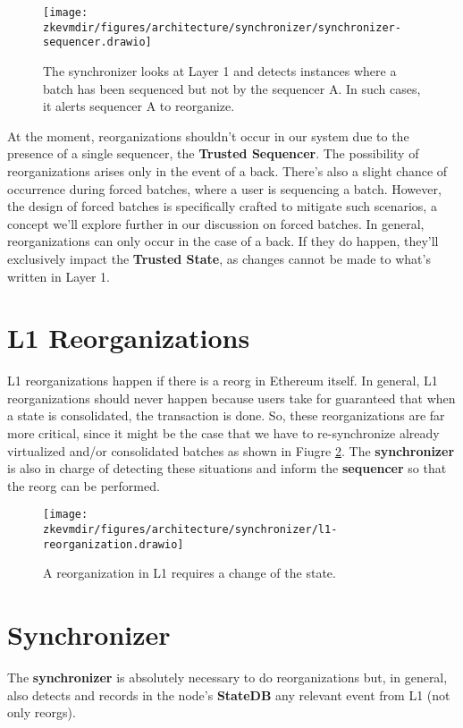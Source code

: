 \begin{figure}[H]
\centering
\texttt{[image: \\zkevmdir/figures/architecture/synchronizer/synchronizer-sequencer.drawio]}
\caption{The synchronizer looks at Layer 1 and detects instances where a batch has been sequenced but not by the sequencer A. In such cases, it alerts sequencer A to reorganize.}
\label{fig:l2-synchronizer}
\end{figure}


At the moment, reorganizations shouldn't occur in our system due to the presence of a single sequencer, the \textbf{Trusted Sequencer}. The possibility of reorganizations arises only in the event of a back. There's also a slight chance of occurrence during forced batches, where a user is sequencing a batch. However, the design of forced batches is specifically crafted to mitigate such scenarios, a concept we'll explore further in our discussion on forced batches. In general, reorganizations can only occur in the case of a back. If they do happen, they'll exclusively impact the \textbf{Trusted State}, as changes cannot be made to what's written in Layer 1.


\section{L1 Reorganizations}
L1 reorganizations happen if there is a reorg in Ethereum itself. In general, L1 reorganizations should never happen because users take for guaranteed that when a state is consolidated, the transaction is done. So, these reorganizations are far more critical, since it might be the case that we have to re-synchronize already virtualized and/or consolidated batches as shown in Fiugre \ref{fig:l1-reorganization}. The \textbf{synchronizer} is also in charge of detecting these situations and inform the \textbf{sequencer} so that the reorg can be performed.

\begin{figure}[H]
\centering
\texttt{[image: \\zkevmdir/figures/architecture/synchronizer/l1-reorganization.drawio]}
\caption{A reorganization in L1 requires a change of the state.}
\label{fig:l1-reorganization}
\end{figure}


\section{Synchronizer}
The \textbf{synchronizer} is absolutely necessary to do reorganizations but, in general, also detects and records in the node's \textbf{StateDB} any relevant event from L1 (not only reorgs).